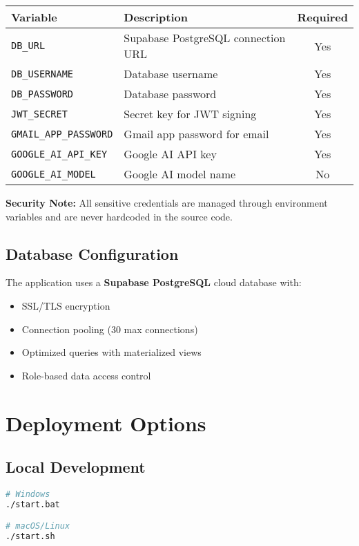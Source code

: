 \documentclass[11pt,a4paper]{article}
\begin{document}
\begin{longtable}{|l|p{6cm}|c|}
\hline
\textbf{Variable} & \textbf{Description} & \textbf{Required} \\
\hline
\endhead
\texttt{DB\_URL} & Supabase PostgreSQL connection URL & Yes \\
\hline
\texttt{DB\_USERNAME} & Database username & Yes \\
\hline
\texttt{DB\_PASSWORD} & Database password & Yes \\
\hline
\texttt{JWT\_SECRET} & Secret key for JWT signing & Yes \\
\hline
\texttt{GMAIL\_APP\_PASSWORD} & Gmail app password for email & Yes \\
\hline
\texttt{GOOGLE\_AI\_API\_KEY} & Google AI API key & Yes \\
\hline
\texttt{GOOGLE\_AI\_MODEL} & Google AI model name & No \\
\hline
\end{longtable}

\textbf{Security Note:} All sensitive credentials are managed through environment variables and are never hardcoded in the source code.

\subsection{Database Configuration}

The application uses a \textbf{Supabase PostgreSQL} cloud database with:
\begin{itemize}[leftmargin=*]
    \item SSL/TLS encryption
    \item Connection pooling (30 max connections)
    \item Optimized queries with materialized views
    \item Role-based data access control
\end{itemize}

\section{Deployment Options}

\subsection{Local Development}
\begin{lstlisting}[language=bash, caption=Local Development Commands]
# Windows
./start.bat

# macOS/Linux
./start.sh
\end{lstlisting}
\end{document}
